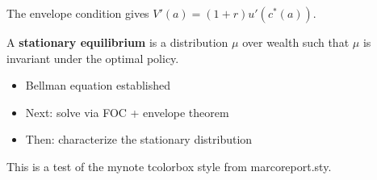 \documentclass[oneside]{article}
\begin{document}
\begin{lemma}
The envelope condition gives $V'(a) = (1+r) u'(c^*(a))$.
\end{lemma}

\begin{definition}
A \textbf{stationary equilibrium} is a distribution $\mu$ over wealth such that $\mu$ is invariant under the optimal policy.
\end{definition}

\begin{itemize}
  \item Bellman equation established
  \item Next: solve via FOC + envelope theorem
  \item Then: characterize the stationary distribution
\end{itemize}

\begin{tcolorbox}[mynote, title=Note]
This is a test of the mynote tcolorbox style from marcoreport.sty.
\end{tcolorbox}
\end{document}
